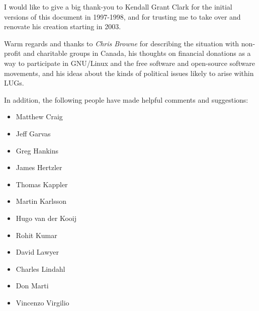 I would like to give a big thank-you to Kendall Grant Clark for the 
initial versions of this document in 1997-1998, and for trusting me to take
over and renovate his creation starting in 2003.

Warm regards and thanks to 
\emph{Chris Browne} \texttt{\aexurl}
 for describing the situation with
non-profit and charitable groups in Canada, his thoughts on financial
donations as a way to participate in GNU/Linux and the free software and 
open-source software movements, and his ideas about the kinds of
political issues likely to arise within LUGs.

In addition, the following people have made helpful comments and
suggestions:

\begin{itemize}
\item Matthew Craig
\item Jeff Garvas
\item Greg Hankins
\item James Hertzler
\item Thomas Kappler
\item Martin Karlsson
\item Hugo van der Kooij
\item Rohit Kumar
\item David Lawyer
\item Charles Lindahl
\item Don Marti
\item Vincenzo Virgilio
\end{itemize}






